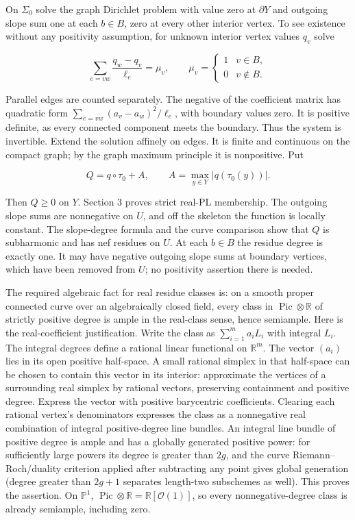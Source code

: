 \documentclass[11pt]{article}
\begin{document}
On $\Sigma_0$ solve the graph Dirichlet problem with value zero at $\partial Y$ and outgoing slope sum one at each $b\in B$, zero at every other interior vertex. To see existence without any positivity assumption, for unknown interior vertex values $q_v$ solve

\[\sum_{e=vw}\frac{q_w-q_v}{\ell_e}=\mu_v,\qquad \mu_v=\begin{cases}1&v\in B,\\0&v\notin B.\end{cases}\]

Parallel edges are counted separately. The negative of the coefficient matrix has quadratic form $\sum_{e=vw}(a_v-a_w)^2/\ell_e$, with boundary values zero. It is positive definite, as every connected component meets the boundary. Thus the system is invertible. Extend the solution affinely on edges. It is finite and continuous on the compact graph; by the graph maximum principle it is nonpositive. Put

\[Q=q\circ\tau_0+A,\qquad A=\max_{y\in Y}|q(\tau_0(y))|.\]

Then $Q\geq0$ on $Y$. Section 3 proves strict real-PL membership. The outgoing slope sums are nonnegative on $U$, and off the skeleton the function is locally constant. The slope-degree formula and the curve comparison show that $Q$ is subharmonic and has nef residues on $U$. At each $b\in B$ the residue degree is exactly one. It may have negative outgoing slope sums at boundary vertices, which have been removed from $U$; no positivity assertion there is needed.

The required algebraic fact for real residue classes is: on a smooth proper connected curve over an algebraically closed field, every class in $\operatorname{Pic}\otimes\mathbb R$ of strictly positive degree is ample in the real-class sense, hence semiample. Here is the real-coefficient justification. Write the class as $\sum_{i=1}^m a_i L_i$ with integral $L_i$. The integral degrees define a rational linear functional on $\mathbb R^m$. The vector $(a_i)$ lies in its open positive half-space. A small rational simplex in that half-space can be chosen to contain this vector in its interior: approximate the vertices of a surrounding real simplex by rational vectors, preserving containment and positive degree. Express the vector with positive barycentric coefficients. Clearing each rational vertex's denominators expresses the class as a nonnegative real combination of integral positive-degree line bundles. An integral line bundle of positive degree is ample and has a globally generated positive power: for sufficiently large powers its degree is greater than $2g$, and the curve Riemann--Roch/duality criterion applied after subtracting any point gives global generation (degree greater than $2g+1$ separates length-two subschemes as well). This proves the assertion. On $\mathbb P^1$, $\operatorname{Pic}\otimes\mathbb R=\mathbb R[\mathcal O(1)]$, so every nonnegative-degree class is already semiample, including zero.
\end{document}
